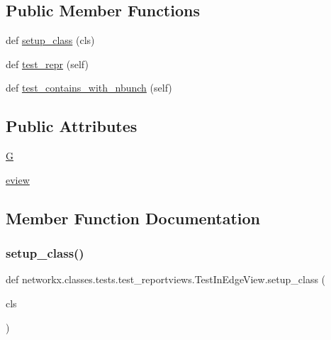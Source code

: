 \subsection*{Public Member Functions}
\begin{DoxyCompactItemize}
\item 
def \hyperlink{classnetworkx_1_1classes_1_1tests_1_1test__reportviews_1_1TestInEdgeView_a1bb7740c8a3712350ae40ac5f364af4f}{setup\+\_\+class} (cls)
\item 
def \hyperlink{classnetworkx_1_1classes_1_1tests_1_1test__reportviews_1_1TestInEdgeView_a405d1eadef60ae7fbe1bd41ad87dbf9a}{test\+\_\+repr} (self)
\item 
def \hyperlink{classnetworkx_1_1classes_1_1tests_1_1test__reportviews_1_1TestInEdgeView_a04c63b22ba1687c4e97c78ee26b54a78}{test\+\_\+contains\+\_\+with\+\_\+nbunch} (self)
\end{DoxyCompactItemize}
\subsection*{Public Attributes}
\begin{DoxyCompactItemize}
\item 
\hyperlink{classnetworkx_1_1classes_1_1tests_1_1test__reportviews_1_1TestInEdgeView_af686b7bf28deaca36b386ed54e68f26e}{G}
\item 
\hyperlink{classnetworkx_1_1classes_1_1tests_1_1test__reportviews_1_1TestInEdgeView_a4262f57cdfcce16229ab079147264fff}{eview}
\end{DoxyCompactItemize}


\subsection{Member Function Documentation}
\mbox{\label{classnetworkx_1_1classes_1_1tests_1_1test__reportviews_1_1TestInEdgeView_a1bb7740c8a3712350ae40ac5f364af4f}} 
\subsubsection{\texorpdfstring{setup\+\_\+class()}{setup\_class()}}
{\footnotesize\ttfamily def networkx.\+classes.\+tests.\+test\+\_\+reportviews.\+Test\+In\+Edge\+View.\+setup\+\_\+class (\begin{DoxyParamCaption}\item[{}]{cls }\end{DoxyParamCaption})}

